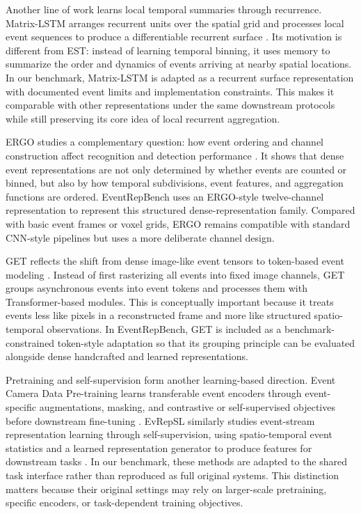 \documentclass[letterpaper]{article}
\begin{document}
Another line of work learns local temporal summaries through recurrence. Matrix-LSTM arranges recurrent units over the spatial grid and processes local event sequences to produce a differentiable recurrent surface \cite{cannici2020matrixlstm}. Its motivation is different from EST: instead of learning temporal binning, it uses memory to summarize the order and dynamics of events arriving at nearby spatial locations. In our benchmark, Matrix-LSTM is adapted as a recurrent surface representation with documented event limits and implementation constraints. This makes it comparable with other representations under the same downstream protocols while still preserving its core idea of local recurrent aggregation.

ERGO studies a complementary question: how event ordering and channel construction affect recognition and detection performance \cite{zubizarreta2023ergo}. It shows that dense event representations are not only determined by whether events are counted or binned, but also by how temporal subdivisions, event features, and aggregation functions are ordered. EventRepBench uses an ERGO-style twelve-channel representation to represent this structured dense-representation family. Compared with basic event frames or voxel grids, ERGO remains compatible with standard CNN-style pipelines but uses a more deliberate channel design.

GET reflects the shift from dense image-like event tensors to token-based event modeling \cite{peng2023get}. Instead of first rasterizing all events into fixed image channels, GET groups asynchronous events into event tokens and processes them with Transformer-based modules. This is conceptually important because it treats events less like pixels in a reconstructed frame and more like structured spatio-temporal observations. In EventRepBench, GET is included as a benchmark-constrained token-style adaptation so that its grouping principle can be evaluated alongside dense handcrafted and learned representations.

Pretraining and self-supervision form another learning-based direction. Event Camera Data Pre-training learns transferable event encoders through event-specific augmentations, masking, and contrastive or self-supervised objectives before downstream fine-tuning \cite{yang2023eventpretraining}. EvRepSL similarly studies event-stream representation learning through self-supervision, using spatio-temporal event statistics and a learned representation generator to produce features for downstream tasks \cite{qu2024evrepsl}. In our benchmark, these methods are adapted to the shared task interface rather than reproduced as full original systems. This distinction matters because their original settings may rely on larger-scale pretraining, specific encoders, or task-dependent training objectives.
\end{document}
